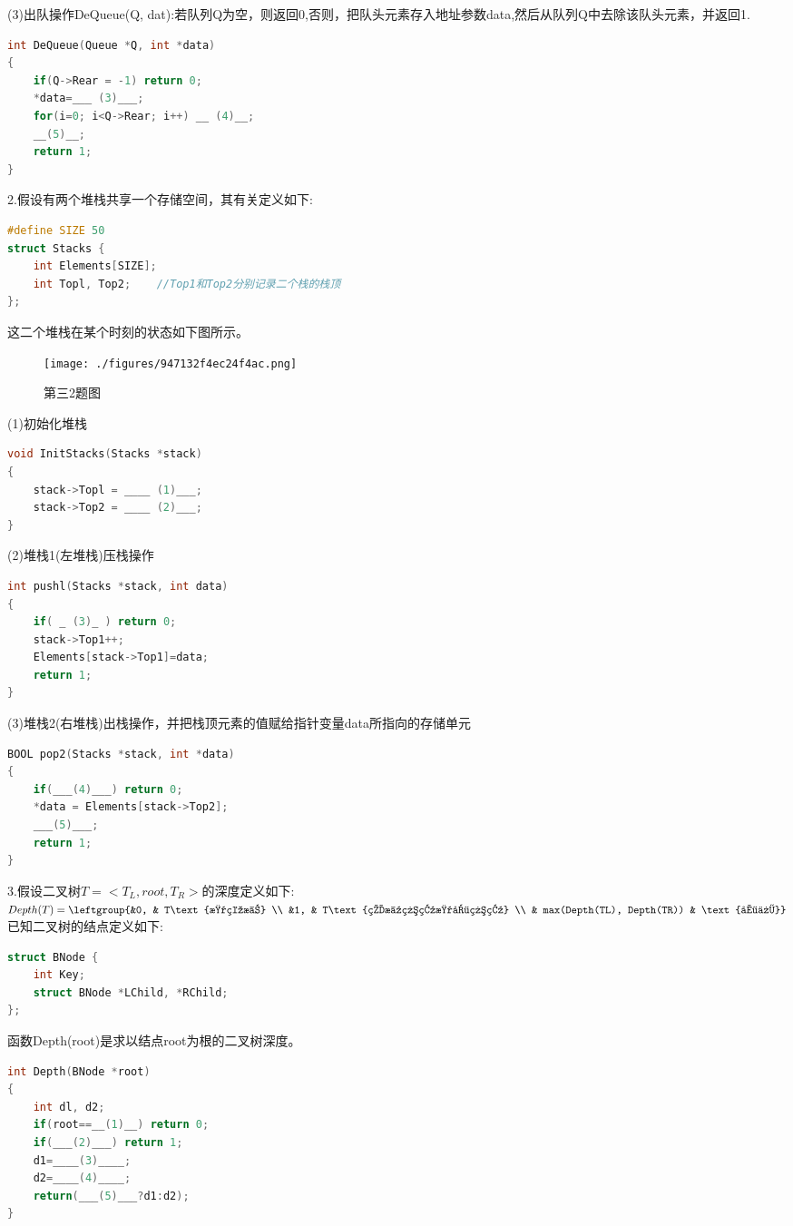 (3)出队操作DeQueue(Q, dat):若队列Q为空，则返回0,否则，把队头元素存入地址参数data,然后从队列Q中去除该队头元素，并返回1.
\begin{lstlisting}[language=cpp]
int DeQueue(Queue *Q, int *data)
{
    if(Q->Rear = -1) return 0;
    *data=___ (3)___;
    for(i=0; i<Q->Rear; i++) __ (4)__;
    __(5)__;
    return 1;
}
\end{lstlisting}

2.假设有两个堆栈共享一个存储空间，其有关定义如下:
\begin{lstlisting}[language=cpp]
#define SIZE 50
struct Stacks {
    int Elements[SIZE];
    int Topl, Top2;    //Top1和Top2分别记录二个栈的栈顶
};
\end{lstlisting}
这二个堆栈在某个时刻的状态如下图所示。
\begin{figure}[ht]
\centering
\texttt{[image: ./figures/947132f4ec24f4ac.png]}
\caption{第三2题图} \label{fig_SYDS11_6}
\end{figure}
(1)初始化堆栈
\begin{lstlisting}[language=cpp]
void InitStacks(Stacks *stack)
{
    stack->Topl = ____ (1)___;
    stack->Top2 = ____ (2)___;
}
\end{lstlisting}
(2)堆栈1(左堆栈)压栈操作
\begin{lstlisting}[language=cpp]
int pushl(Stacks *stack, int data)
{
    if( _ (3)_ ) return 0;
    stack->Top1++;
    Elements[stack->Top1]=data;
    return 1;
}
\end{lstlisting}
(3)堆栈2(右堆栈)出栈操作，并把栈顶元素的值赋给指针变量data所指向的存储单元
\begin{lstlisting}[language=cpp]
BOOL pop2(Stacks *stack, int *data)
{
    if(___(4)___) return 0;
    *data = Elements[stack->Top2];
    ___(5)___;
    return 1;
}
\end{lstlisting}

3.假设二叉树$T=<T_L,root,T_R>$的深度定义如下: \\
$Depth(T)=\leftgroup{&0, & T\text{是空树} \\ &1, & T\text{的根结点是叶结点} \\ & max(Depth(TL), Depth(TR)) & \text{其他}}$
\\
已知二叉树的结点定义如下:
\begin{lstlisting}[language=cpp]
struct BNode {
    int Key;
    struct BNode *LChild, *RChild;
};
\end{lstlisting}
函数Depth(root)是求以结点root为根的二叉树深度。
\begin{lstlisting}[language=cpp]
int Depth(BNode *root)
{
    int dl, d2;
    if(root==__(1)__) return 0;
    if(___(2)___) return 1;
    d1=____(3)____;
    d2=____(4)____;
    return(___(5)___?d1:d2);
}
\end{lstlisting}

